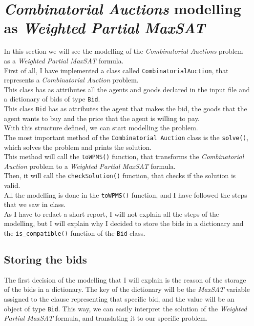 \documentclass[11pt]{article}
\begin{document}
    \section{\textit{Combinatorial Auctions} modelling as \textit{Weighted Partial MaxSAT}}
    \label{sec:combinatorialauctions}
        In this section we will see the modelling of the \textit{Combinatorial Auctions} problem as a \textit{Weighted Partial MaxSAT} formula.\\
        First of all, I have implemented a class called \verb|CombinatorialAuction|, that represents a \textit{Combinatorial Auction} problem.\\
        This class has as attributes all the agents and goods declared in the input file and a dictionary of bids of type \verb|Bid|.\\
        This class \verb|Bid| has as attributes the agent that makes the bid, the goods that the agent wants to buy and the price that the agent is willing to pay.\\
        With this structure defined, we can start modelling the problem.\\
        The most important method of the \verb|Combinatorial Auction| class is the \verb|solve()|, which solves the problem and prints the solution.\\
        This method will call the \verb|toWPMS()| function, that transforms the \textit{Combinatorial Auction} problem to a \textit{Weighted Partial MaxSAT} formula.\\
        Then, it will call the \verb|checkSolution()| function, that checks if the solution is valid.\\
        All the modelling is done in the \verb|toWPMS()| function, and I have followed the steps that we saw in class.\\
        As I have to redact a short report, I will not explain all the steps of the modelling, but I will explain why I decided to store the bids in a dictionary and the
        \verb|is_compatible()| function of the \verb|Bid| class.\\

    \subsection{Storing the bids}
    \label{subsec:storingbids}
        The first decision of the modelling that I will explain is the reason of the storage of the bids in a dictionary.
        The key of the dictionary will be the \textit{MaxSAT} variable assigned to the clause representing that specific bid, and the value will be an object of type \verb|Bid|.
        This way, we can easily interpret the solution of the \textit{Weighted Partial MaxSAT} formula, and translating it to our specific problem.\\
\end{document}
